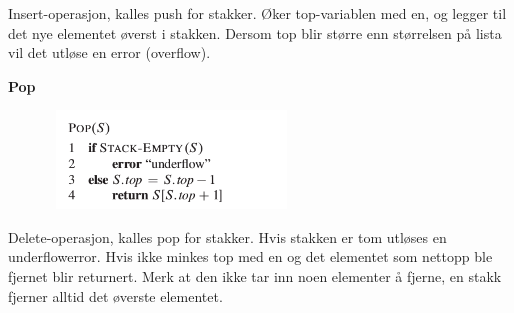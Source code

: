 \documentclass[12pt]{report}
\begin{document}
\begin{multicols}{2}

{\fontsize{13pt}{15.6pt}\selectfont  \par}\par

Insert-operasjon, kalles push for stakker. Øker top-variablen med en, og legger til det nye elementet øverst i stakken. Dersom top blir større enn størrelsen på lista vil det utløse en error (overflow).\par

{\fontsize{13pt}{15.6pt}\selectfont \textbf{Pop}\par}\par




\begin{figure}[H]
	\begin{Center}
		\includegraphics[width=2.57in,height=1.03in]{./media/image12.png}
	\end{Center}
\end{figure}



\par

Delete-operasjon, kalles pop for stakker. Hvis stakken er tom utløses en underflowerror. Hvis ikke minkes top med en og det elementet som nettopp ble fjernet blir returnert. Merk at den ikke tar inn noen elementer å fjerne, en stakk fjerner alltid det øverste elementet.\par


\vspace{\baselineskip}

\vspace{\baselineskip}

\vspace{\baselineskip}

\vspace{\baselineskip}

\vspace{\baselineskip}

\vspace{\baselineskip}

\vspace{\baselineskip}

\vspace{\baselineskip}

\end{multicols}
\end{document}
